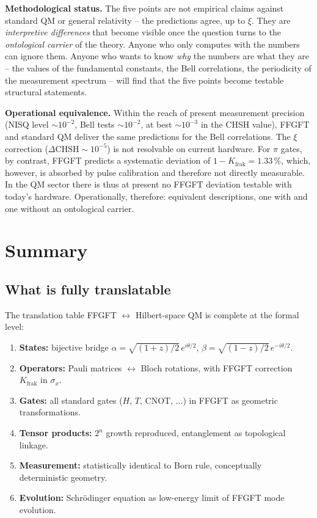 \textbf{Methodological status.} The five points are not empirical
claims against standard QM or general relativity -- the predictions
agree, up to $\xi$. They are \emph{interpretive differences} that
become visible once the question turns to the \emph{ontological
carrier} of the theory. Anyone who only computes with the numbers can
ignore them. Anyone who wants to know \emph{why} the numbers are what
they are -- the values of the fundamental constants, the Bell
correlations, the periodicity of the measurement spectrum -- will
find that the five points become testable structural statements.

\textbf{Operational equivalence.} Within the reach of present
measurement precision (NISQ level $\sim 10^{-2}$, Bell tests
$\sim 10^{-2}$, at best $\sim 10^{-3}$ in the CHSH value), FFGFT and
standard QM deliver the same predictions for the Bell correlations. The $\xi$ correction
($\Delta\text{CHSH} \sim 10^{-5}$) is not resolvable on current hardware.
For $\pi$ gates, by contrast, FFGFT predicts a systematic deviation of
$1 - K_{\text{frak}} = 1.33\,\%$, which, however, is absorbed by pulse
calibration and therefore not directly measurable. In the QM sector
there is thus at present no FFGFT deviation testable with today's
hardware. Operationally, therefore:
equivalent descriptions, one with and one
without an ontological carrier.

\section{Summary}

\subsection*{What is fully translatable}

The translation table FFGFT $\leftrightarrow$ Hilbert-space QM is
complete at the formal level:

\begin{enumerate}[leftmargin=2em,itemsep=2pt,topsep=2pt]
  \item \textbf{States:} bijective bridge
        $\alpha = \sqrt{(1+z)/2}\,e^{i\theta/2}$,
        $\beta = \sqrt{(1-z)/2}\,e^{-i\theta/2}$.
  \item \textbf{Operators:} Pauli matrices $\leftrightarrow$ Bloch
        rotations, with FFGFT correction $K_{\text{frak}}$ in
        $\sigma_x$.
  \item \textbf{Gates:} all standard gates ($H$, $T$, CNOT, ...) in
        FFGFT as geometric transformations.
  \item \textbf{Tensor products:} $2^n$ growth reproduced,
        entanglement as topological linkage.
  \item \textbf{Measurement:} statistically identical to Born rule,
        conceptually deterministic geometry.
  \item \textbf{Evolution:} Schrödinger equation as low-energy limit
        of FFGFT mode evolution.
\end{enumerate}

